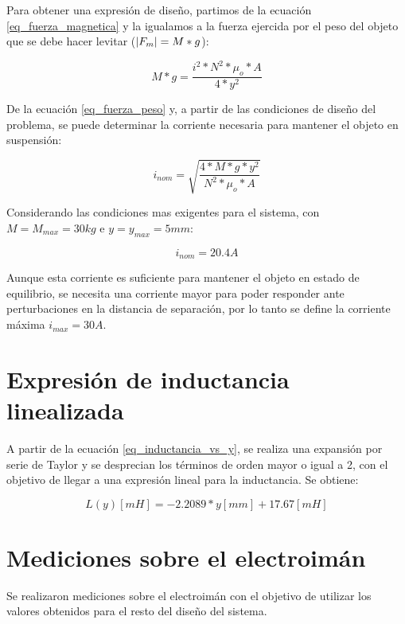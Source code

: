 \noindent Para obtener una expresión de diseño, partimos de la ecuación \ref{eq_fuerza_magnetica} y la igualamos a la fuerza ejercida por el peso del objeto que se debe hacer levitar ($\lvert F_{m}\rvert=M*g$):

\begin{equation}\label{eq_fuerza_peso}
	M*g=\frac{i^{2}*N^{2}*\mu_{o}*A}{4*y^{2}}
\end{equation}

\noindent De la ecuación \ref{eq_fuerza_peso} y, a partir de las condiciones de diseño del problema, se puede determinar la corriente necesaria para mantener el objeto en suspensión:

\begin{equation} \label{eq_corriente_peso}
	i_{nom}=\sqrt{\frac{4*M*g*y^{2}}{N^{2}*\mu_{o}*A}}
\end{equation}

Considerando las condiciones mas exigentes para el sistema, con $M=M_{max}=30kg$ e $y=y_{max}=5mm$:

\begin{equation}
	i_{nom}=20.4A
\end{equation}

\noindent Aunque esta corriente es suficiente para mantener el objeto en estado de equilibrio, se necesita una corriente mayor para poder responder ante perturbaciones en la distancia de separación, por lo tanto se define la corriente máxima $i_{max}=30A$.



\section{Expresión de inductancia linealizada}

\noindent A partir de la ecuación \ref{eq_inductancia_vs_y}, se realiza una expansión por serie de Taylor y se desprecian los términos de orden mayor o igual a 2, con el objetivo de llegar a una expresión lineal para la inductancia. Se obtiene:

\begin{equation} \label{eq_inductancia_lineal_teorica}
	L(y)[mH]=-2.2089*y[mm]+17.67 [mH]
\end{equation}

\section{Mediciones sobre el electroimán}

\noindent Se realizaron mediciones sobre el electroimán con el objetivo de utilizar los valores obtenidos para el resto del diseño del sistema.

